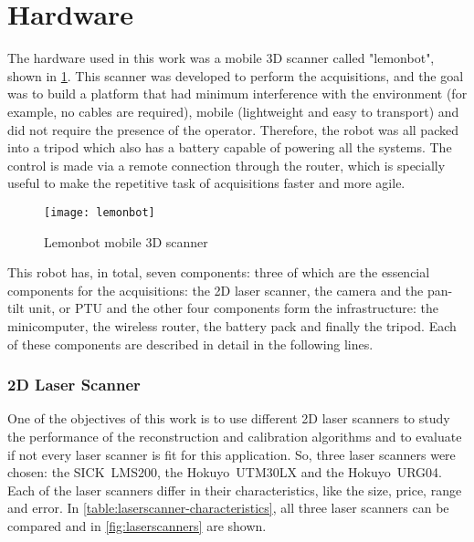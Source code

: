 \section{Hardware}
\label{section:hardware}

The hardware used in this work was a mobile 3D scanner called "lemonbot", shown in \cref{fig:lemonbot}. This scanner was developed to perform the acquisitions, and the goal was to build a platform that had minimum interference with the environment (for example, no cables are required), mobile (lightweight and easy to transport) and did not require the presence of the operator. Therefore, the robot was all packed into a tripod which also has a battery capable of powering all the systems. The control is made via a remote connection through the router, which is specially useful to make the repetitive task of acquisitions faster and more agile. 

\begin{figure}[p]
    
    \centering
    \texttt{[image: lemonbot]}

    \caption{Lemonbot mobile 3D scanner}
    \label{fig:lemonbot}
\end{figure}

This robot has, in total, seven components: three of which are the essencial components for the acquisitions: the 2D laser scanner, the camera and the pan-tilt unit, or PTU and the other four components form the infrastructure: the minicomputer, the wireless router, the battery pack and finally the tripod. Each of these components are described in detail in the following lines.

\subsubsection{2D Laser Scanner}

One of the objectives of this work is to use different 2D laser scanners to study the performance of the reconstruction and calibration algorithms and to evaluate if not every laser scanner is fit for this application. So, three laser scanners were chosen: the SICK~LMS200, the Hokuyo~UTM30LX and the Hokuyo~URG04. Each of the laser scanners differ in their characteristics, like the size, price, range and error. In \cref{table:laserscanner-characteristics}, all three laser scanners can be compared and in \cref{fig:laserscanners} are shown.

